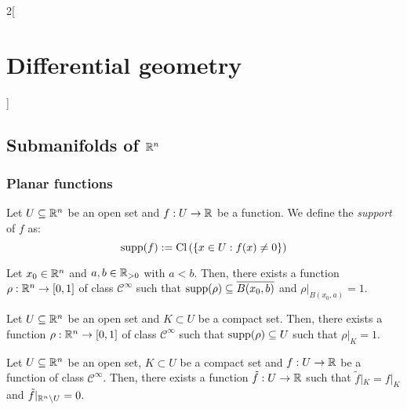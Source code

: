 \documentclass[../../../main.tex]{subfiles}
\begin{document}
\begin{multicols}{2}[\section{Differential geometry}]
  \subsection{Submanifolds of \texorpdfstring{$\mathbb{R}^n$}{Rn}}
  \subsubsection{Planar functions}
  \begin{definition}
    Let $U\subseteq\mathbb{R}^n$ be an open set and $f:U\rightarrow\mathbb{R}$ be a function. We define the \emph{support} of $f$ as:
    $$\operatorname{supp}(f):=\operatorname{Cl}\left(\{x\in U:f(x)\ne 0\}\right)$$
  \end{definition}
  \begin{lemma}
    Let $x_0\in\mathbb{R}^n$ and $a,b\in \mathbb{R}_{>0}$ with $a<b$. Then, there exists a function $\rho:\mathbb{R}^n\rightarrow[0,1]$ of class $\mathcal{C}^\infty$ such that $\operatorname{supp}(\rho)\subseteq\overline{B(x_0,b)}$ and $\rho|_{B(x_0,a)}=1$.
  \end{lemma}
  \begin{proposition}
    Let $U\subseteq\mathbb{R}^n$ be an open set and $K\subset U$ be a compact set. Then, there exists a function $\rho:\mathbb{R}^n\rightarrow[0,1]$ of class $\mathcal{C}^\infty$ such that $\operatorname{supp}(\rho)\subseteq U$ such that $\rho|_K=1$.
  \end{proposition}
  \begin{corollary}
    Let $U\subseteq\mathbb{R}^n$ be an open set, $K\subset U$ be a compact set and $f:U\rightarrow \mathbb{R}$ be a function of class $\mathcal{C}^\infty$. Then, there exists a function $\tilde{f}:U\rightarrow \mathbb{R}$ such that $\tilde{f}|_K=f|_K$ and $\tilde{f}|_{\mathbb{R}^n\setminus U}=0$.
  \end{corollary}

\end{multicols}
\end{document}
